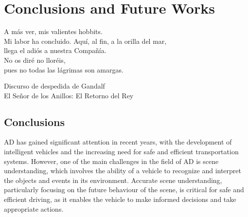 % 
% 
% 
% 
% 
% 
% 

\chapter{Conclusions and Future Works}
\label{cha:conclusions_and_future_works}

\begin{FraseCelebre}
	\begin{Frase}
		A más ver, mis valientes hobbits. \\
		Mi labor ha concluido. Aquí, al fin, a la orilla del mar, \\
		llega el adiós a nuestra Compañía. \\
		No os diré no lloréis, \\
		pues no todas las lágrimas son amargas.
	\end{Frase}
	\begin{Fuente}
		Discurso de despedida de Gandalf \\
		El Señor de los Anillos: El Retorno del Rey
	\end{Fuente}
\end{FraseCelebre}

\section{Conclusions}
\label{sec:9_conclusions}

\ac{AD} has gained significant attention in recent years, with the development of intelligent vehicles and the increasing need for safe and efficient transportation systems. However, one of the main challenges in the field of \ac{AD} is scene understanding, which involves the ability of a vehicle to recognize and interpret the objects and events in its environment. Accurate scene understanding, particularly focusing on the future behaviour of the scene, is critical for safe and efficient driving, as it enables the vehicle to make informed decisions and take appropriate actions.

